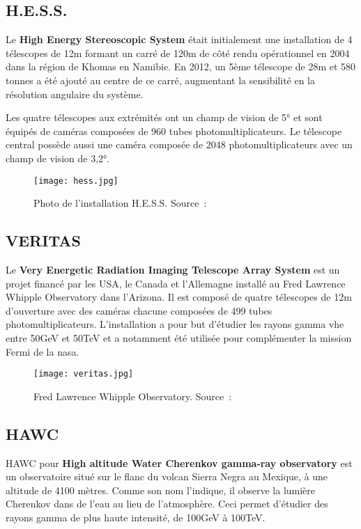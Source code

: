 \subsection{H.E.S.S.}
Le \textbf{High Energy Stereoscopic System} était initialement une installation de 4 télescopes de 12m formant un carré de 120m de côté rendu opérationnel en 2004 dans la région de Khomas en Namibie.
En 2012, un 5ème télescope de 28m et 580 tonnes a été ajouté au centre de ce carré, augmentant la sensibilité en la résolution angulaire du système. \cite{Hess}

Les quatre télescopes aux extrémités ont un champ de vision de 5° et sont équipés de caméras composées de 960 tubes photomultiplicateurs.
Le télescope central possède aussi une caméra composée de 2048 photomultiplicateurs avec un champ de vision de 3,2°.

\begin{figure}[tbph!]
	\centering
	\texttt{[image: hess.jpg]}
	\caption[Photo de l'installation H.E.S.S]{Photo de l'installation H.E.S.S. Source : \cite{HessImage}}
\end{figure}

\subsection{VERITAS}
Le \textbf{Very Energetic Radiation Imaging Telescope Array System} est un projet financé par les USA, le Canada et l'Allemagne installé au Fred Lawrence Whipple Observatory dans l'Arizona.
Il est composé de quatre télescopes de 12m d'ouverture avec des caméras chacune composées de 499 tubes photomultiplicateurs. \cite{Veritas} 
L'installation a pour but d'étudier les rayons gamma \gls{vhe} entre 50GeV et 50TeV et a notamment été utilisée pour complémenter la mission Fermi de la \gls{nasa}.

\begin{figure}[tbph!]
	\centering
	\texttt{[image: veritas.jpg]}
	\caption[Fred Lawrence Whipple Observatory]{Fred Lawrence Whipple Observatory. Source : \cite{Veritas}}
\end{figure}

\subsection{HAWC}
HAWC pour \textbf{High altitude Water Cherenkov gamma-ray observatory} est un observatoire situé sur le flanc du volcan Sierra Negra au Mexique, à une altitude de 4100 mètres.
Comme son nom l'indique, il observe la lumière Cherenkov dans de l'eau au lieu de l'atmosphère. Ceci permet d'étudier des rayons gamma de plus haute intensité, de 100GeV à 100TeV. \cite{Hawc}

